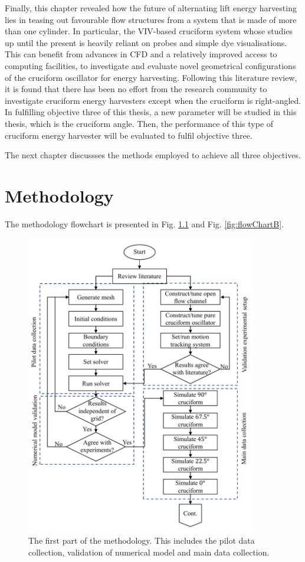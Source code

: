 \documentclass[oneside]{utmthesis}
\begin{document}
Finally, this chapter revealed how the future of alternating lift energy harvesting lies in teasing out favourable flow structures from a system that is made of more than one cylinder. In particular, the VIV-based cruciform system whose studies up until the present is heavily reliant on probes and simple dye visualisations. This can benefit from advances in CFD and a relatively improved access to computing facilities, to investigate and evaluate novel geometrical configurations of the cruciform oscillator for energy harvesting. Following this literature review, it is found that there has been no effort from the research community to investigate cruciform energy harvesters except when the cruciform is right-angled. In fulfilling objective three of this thesis, a new parameter will be studied in this thesis, which is the cruciform angle. Then, the performance of this type of cruciform energy harvester will be evaluated to fulfil objective three.

The next chapter discussses the methods employed to achieve all three objectives.

\chapter{Methodology} \label{chap:method}

The methodology flowchart is presented in Fig. \ref{fig:flowChartA} and Fig. \ref{fig:flowChartB}.

\begin{figure}[!h]
  \centering
  \hspace{1cm} \includegraphics[width=0.9\textwidth]{figs/flowChartA}
  \caption{The first part of the methodology. This includes the pilot data collection, validation of numerical model and main data collection.}
  \label{fig:flowChartA}
\end{figure}
\end{document}
